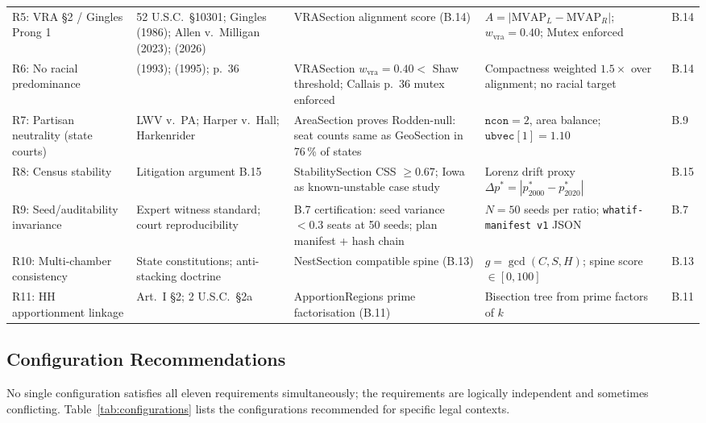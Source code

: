 \begin{landscape}
\begin{table}[p]
\begin{tabular}{p{3.5cm}p{2.5cm}p{3.5cm}p{2.0cm}p{1.5cm}}
R5: VRA \S2 / Gingles Prong 1 & 52 U.S.C.\ \S10301; Gingles (1986); Allen v.\ Milligan (2023); \callais{} (2026) & VRASection alignment score (B.14) & $A=|\mathrm{MVAP}_L - \mathrm{MVAP}_R|$; $w_\text{vra}=0.40$; Mutex enforced & B.14 \\[0.5em]

R6: No racial predominance & \shaw{} (1993); \miller{} (1995); \callais{} p.~36 & VRASection $w_\text{vra}=0.40 < $ Shaw threshold; Callais p.~36 mutex enforced & Compactness weighted $1.5\times$ over alignment; no racial target & B.14 \\[0.5em]

R7: Partisan neutrality (state courts) & LWV v.\ PA; Harper v.\ Hall; Harkenrider & AreaSection proves Rodden-null: seat counts same as GeoSection in 76\,\% of states & $\mathtt{ncon}=2$, area balance; $\mathtt{ubvec}[1]=1.10$ & B.9 \\[0.5em]

R8: Census stability & Litigation argument B.15 & StabilitySection CSS $\geq 0.67$; Iowa as known-unstable case study & Lorenz drift proxy $\Delta p^* = |p^*_{2000} - p^*_{2020}|$ & B.15 \\[0.5em]

R9: Seed/auditability invariance & Expert witness standard; court reproducibility & B.7 certification: seed variance $<0.3$ seats at 50 seeds; plan manifest + hash chain & $N=50$ seeds per ratio; \texttt{whatif-manifest v1} JSON & B.7 \\[0.5em]

R10: Multi-chamber consistency & State constitutions; anti-stacking doctrine & NestSection compatible spine (B.13) & $g=\gcd(C,S,H)$; spine score $\in [0, 100]$ & B.13 \\[0.5em]

R11: HH apportionment linkage & Art.~I \S2; 2 U.S.C.\ \S2a & ApportionRegions prime factorisation (B.11) & Bisection tree from prime factors of $k$ & B.11 \\
\bottomrule
\end{tabular}
\end{table}
\end{landscape}

\subsection{Configuration Recommendations}

No single configuration satisfies all eleven requirements simultaneously;
the requirements are logically independent and sometimes conflicting.
Table~\ref{tab:configurations} lists the configurations recommended for specific
legal contexts.

